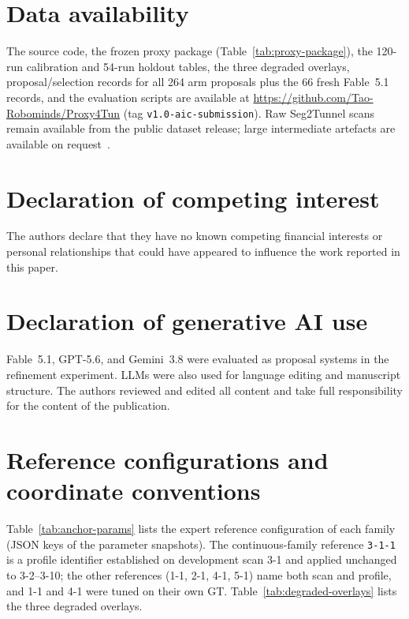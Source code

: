 \documentclass[a4paper,fleqn]{cas-dc}
\begin{document}
\section*{Data availability}

The source code, the frozen proxy package (Table~\ref{tab:proxy-package}), the 120-run calibration and 54-run holdout tables, the three degraded overlays, proposal/selection records for all 264 arm proposals plus the 66 fresh Fable~5.1 records, and the evaluation scripts are available at \url{https://github.com/Tao-Robominds/Proxy4Tun} (tag \texttt{v1.0-aic-submission}). Raw Seg2Tunnel scans remain available from the public dataset release; large intermediate artefacts are available on request~\cite{lin2024seg2tunnel}.

\section*{Declaration of competing interest}

The authors declare that they have no known competing financial interests or personal relationships that could have appeared to influence the work reported in this paper.

\section*{Declaration of generative AI use}

Fable~5.1, GPT-5.6, and Gemini~3.8 were evaluated as proposal systems in the refinement experiment. LLMs were also used for language editing and manuscript structure. The authors reviewed and edited all content and take full responsibility for the content of the publication.




\appendix

\section{Reference configurations and coordinate conventions}\label{app:anchor-parameter}

Table~\ref{tab:anchor-params} lists the expert reference configuration of each family (JSON keys of the parameter snapshots). The continuous-family reference \texttt{3-1-1} is a profile identifier established on development scan 3-1 and applied unchanged to 3-2--3-10; the other references (1-1, 2-1, 4-1, 5-1) name both scan and profile, and 1-1 and 4-1 were tuned on their own GT. Table~\ref{tab:degraded-overlays} lists the three degraded overlays.
\end{document}
